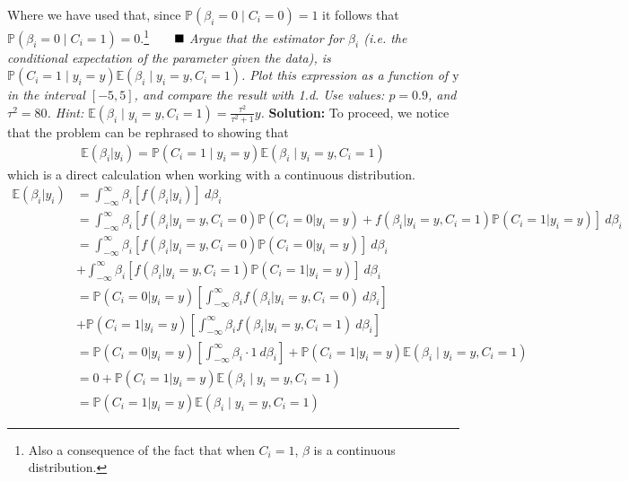 Where we have used that, since $\mathbb{P}\left(\beta_i=0 \mid C_i=0\right)=1$ it follows that $\mathbb{P}\left(\beta_i=0 \mid C_i=1\right)=0$.\footnote{Also a consequence of the fact that when $C_i = 1$, $\beta$ is a continuous distribution.}$\Q$ \spaze
\noindent
{}
\emph{Argue that the estimator for $\beta_i$ (i.e. the conditional expectation of the parameter given the data), is $\mathbb{P}\left(C_i=1 \mid y_i=y\right) \mathbb{E}\left(\beta_i \mid y_i=y, C_i=1\right)$. Plot this expression as a function of $\mathrm{y}$ in the interval $[-5,5]$, and compare the result with 1.d. Use values: $p=0.9$, and $\tau^2=80$. Hint: $\mathbb{E}\left(\beta_i \mid y_i=y, C_i=1\right)=\frac{\tau^2}{\tau^2 + 1} y$.}  \spaze
\textbf{Solution:} \spaze
To proceed, we notice that the problem can be rephrased to showing that 
\begin{align}
    \mathbb{E}(\beta_i | y_i) = \mathbb{P}\left(C_i=1 \mid y_i=y\right) \mathbb{E}\left(\beta_i \mid y_i=y, C_i=1\right)
\end{align}
which is a direct calculation when working with a continuous distribution. 
\begin{align*}
      \mathbb{E}(\beta_i | y_i) &= \int_{-\infty}^{\infty} \beta_i \left[ f(\beta_i |y_i) \right] \ d\beta_i \\[5pt]
      &=  \int_{-\infty}^{\infty} \beta_i \left[ f(\beta_i|y_i=y, C_i=0) \mathbb{P}(C_i=0|y_i=y) + f(\beta_i|y_i=y, C_i=1) \mathbb{P}(C_i=1|y_i=y) \right] \ d\beta_i \\[5pt]
      &=  \int_{-\infty}^{\infty} \beta_i \left[ f(\beta_i|y_i=y, C_i=0) \mathbb{P}(C_i=0|y_i=y)\right] \ d\beta_i \\ 
      &+  \int_{-\infty}^{\infty} \beta_i \left[ f(\beta_i|y_i=y, C_i=1) \mathbb{P}(C_i=1|y_i=y) \right] \ d\beta_i \\[5pt]
      &= \mathbb{P}(C_i=0|y_i=y) \left[ \int_{-\infty}^{\infty} \beta_i f(\beta_i|y_i=y, C_i=0) \ d\beta_i  \right] \\ 
      &+  \mathbb{P}(C_i=1|y_i=y) \left[\int_{-\infty}^{\infty} \beta_i f(\beta_i|y_i=y, C_i=1) \ d \beta_i \right] \\[5pt]
      &= \mathbb{P}(C_i=0|y_i=y) \left[ \int_{-\infty}^{\infty} \beta_i \cdot 1 \ d\beta_i  \right] + \mathbb{P}(C_i=1|y_i=y) \mathbb{E}\left(\beta_i \mid y_i=y, C_i=1\right) \\[5pt]
      &= 0 + \mathbb{P}(C_i=1|y_i=y) \mathbb{E}\left(\beta_i \mid y_i=y, C_i=1\right) \\[8pt]
      &= \mathbb{P}(C_i=1|y_i=y) \mathbb{E}\left(\beta_i \mid y_i=y, C_i=1\right)
\end{align*}
